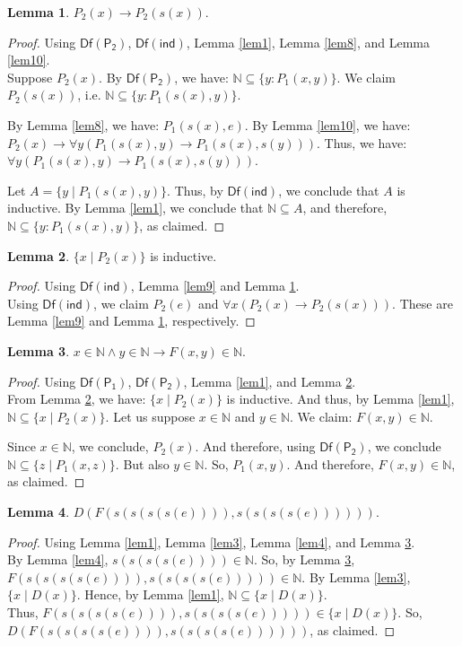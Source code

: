 \documentclass[11pt,a4paper]{article}
\newcommand{\N}{ \ensuremath{ \mathbb{N}}}
\theoremstyle{definition}
\newtheorem{lem}{Lemma}
\begin{document}
\begin{lem}\label{lem11} $P_2(x) \to P_2(s(x))$.\end{lem}
\begin{proof} Using $\mathsf{Df(P_2)}$, $\mathsf{Df(ind)}$, Lemma \ref{lem1}, Lemma \ref{lem8}, and Lemma \ref{lem10}.\\
Suppose $P_2(x)$. By $\mathsf{Df(P_2)}$, we have: $\N \subseteq \{y : P_1(x, y)\}$. We claim $P_2(s(x))$, i.e. 
$\N \subseteq \{y : P_1(s(x), y)\}$.

By Lemma \ref{lem8}, we have: $P_1(s(x), e)$. By Lemma \ref{lem10}, we have: $P_2(x) \to \forall y (P_1(s(x), y) \to P_1(s(x), s(y)))$. Thus, we have: $\forall y (P_1(s(x), y) \to P_1(s(x), s(y)))$.

Let $A = \{y \mid P_1(s(x), y)\}$. Thus, by $\mathsf{Df(ind)}$, we conclude that $A$ is inductive. By Lemma \ref{lem1}, we conclude that $\N \subseteq A$, and therefore, $\N \subseteq \{y : P_1(s(x), y)\}$, as claimed.
\end{proof}

\begin{lem}\label{lem12} $\{x \mid P_2(x)\}$ is inductive.\end{lem}
\begin{proof} Using $\mathsf{Df(ind)}$, Lemma \ref{lem9} and Lemma \ref{lem11}.\\
Using $\mathsf{Df(ind)}$, we claim $P_2(e)$ and $\forall x (P_2(x) \to P_2(s(x)))$. These are Lemma \ref{lem9} and Lemma \ref{lem11}, respectively.
 \end{proof}

\begin{lem}\label{lem13} $x \in \N \wedge y \in \N \to F(x,y) \in \N$.\end{lem}
\begin{proof} Using $\mathsf{Df(P_1)}$, $\mathsf{Df(P_2)}$, Lemma \ref{lem1}, and Lemma \ref{lem12}.\\
 From Lemma \ref{lem12}, we have: $\{x \mid P_2(x)\}$ is inductive. And thus, by Lemma \ref{lem1}, $\N \subseteq \{x \mid P_2(x)\}$. Let us suppose $x \in \N$ and $y \in \N$. We claim: $F(x,y) \in \N$.

Since $x \in \N$, we conclude, $P_2(x)$. And therefore, using $\mathsf{Df(P_2)}$, we conclude $ \N \subseteq \{z \mid P_1(x, z)\}$. But also $y \in \N$. So, $P_1(x, y)$. And therefore, $F(x, y) \in \N$, as claimed.
\end{proof}

\begin{lem}\label{lem14} $D(F(s(s(s(s(e)))), s(s(s(s(e))))))$.\end{lem}
\begin{proof} Using Lemma \ref{lem1}, Lemma \ref{lem3}, Lemma \ref{lem4}, and Lemma \ref{lem13}.\\
By Lemma \ref{lem4}, $s(s(s(s(e)))) \in \N$. 
So, by Lemma \ref{lem13}, $F(s(s(s(s(e)))), s(s(s(s(e))))) \in \N$. By Lemma \ref{lem3}, $\{x \mid D(x)\}$. Hence, by Lemma \ref{lem1}, $\N \subseteq \{x \mid D(x)\}$.\\
Thus, $F(s(s(s(s(e)))), s(s(s(s(e))))) \in \{x \mid D(x)\}$. So, 
$D(F(s(s(s(s(e)))), s(s(s(s(e))))))$, as claimed.
\end{proof}
\end{document}
